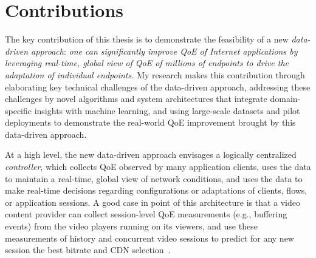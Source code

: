 \section{Contributions}

The key contribution of this thesis is to demonstrate the feasibility of a new 
{\em data-driven approach}:
{\em one can significantly improve QoE of Internet applications by leveraging
real-time, global view of QoE of millions of endpoints to drive the
adaptation of individual endpoints.}
My research makes this contribution through elaborating key technical 
challenges of the data-driven approach, addressing these challenges by
novel algorithms and system architectures that integrate domain-specific 
insights with machine learning,
and using large-scale datasets and pilot deployments to demonstrate
the real-world QoE improvement brought by this data-driven approach.

At a high level, the new data-driven approach envisages a logically centralized 
{\em controller}, which collects QoE observed by many application clients, 
uses the data to maintain a real-time, global view of network conditions,
and uses the data to make real-time decisions
regarding configurations or adaptations of clients, flows, or application sessions.
A good case in point of this architecture is that a video content provider can 
collect session-level QoE measurements (e.g., buffering events) from 
the video players running on its viewers, and use these measurements of 
history and concurrent video sessions to predict for any new session the best
bitrate and CDN selection~\cite{c3}.


